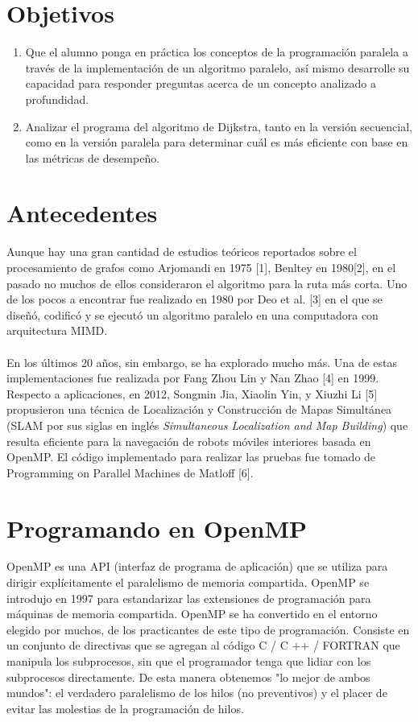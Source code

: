 \documentclass[11pt]{article}
\begin{document}
\section{Objetivos}
\begin{enumerate}
\item Que el alumno ponga en práctica los conceptos de la programación paralela a través de la implementación de un algoritmo paralelo, así mismo desarrolle su capacidad para responder preguntas acerca de un concepto analizado a profundidad.
\item Analizar el programa del algoritmo de Dijkstra, tanto en la versión secuencial, como en la versión paralela para determinar cuál es más eficiente con base en las métricas de desempeño.

\end{enumerate}

\section{Antecedentes}
Aunque hay una gran cantidad de estudios teóricos reportados sobre el procesamiento de grafos como Arjomandi en 1975 [1], Benltey en 1980[2], en el pasado no muchos de ellos consideraron el algoritmo para la ruta más corta. Uno de los pocos a encontrar fue realizado en 1980 por Deo et al. [3] en el que se diseñó, codificó y se ejecutó un algoritmo paralelo en una computadora con arquitectura MIMD. 

\paragraph{}
En los últimos 20 años, sin embargo, se ha explorado mucho más. Una de estas implementaciones fue realizada por Fang Zhou Lin y Nan Zhao [4] en 1999. Respecto a aplicaciones, en 2012, Songmin Jia, Xiaolin Yin, y Xiuzhi Li [5] propusieron una técnica de Localización y Construcción de Mapas Simultánea (SLAM por sus siglas en inglés \textit {Simultaneous Localization and Map Building}) que resulta eficiente para la navegación de robots móviles interiores basada en OpenMP. 
El código implementado para realizar las pruebas fue tomado de Programming on Parallel Machines de Matloff [6].


\section{Programando en OpenMP}
OpenMP es una API (interfaz de programa de aplicación) que se utiliza para dirigir explícitamente el paralelismo de memoria compartida. OpenMP se introdujo en 1997 para estandarizar las extensiones de programación para máquinas de memoria compartida. OpenMP se ha convertido en el entorno elegido por muchos, de los practicantes de este tipo de programación. Consiste en un conjunto de directivas que se agregan al código C / C ++ / FORTRAN que manipula los subprocesos, sin que el programador tenga que lidiar con los subprocesos directamente. De esta manera obtenemos "lo mejor de ambos mundos": el verdadero paralelismo de los hilos (no preventivos) y el placer de evitar las molestias de la programación de hilos. 
\end{document}
